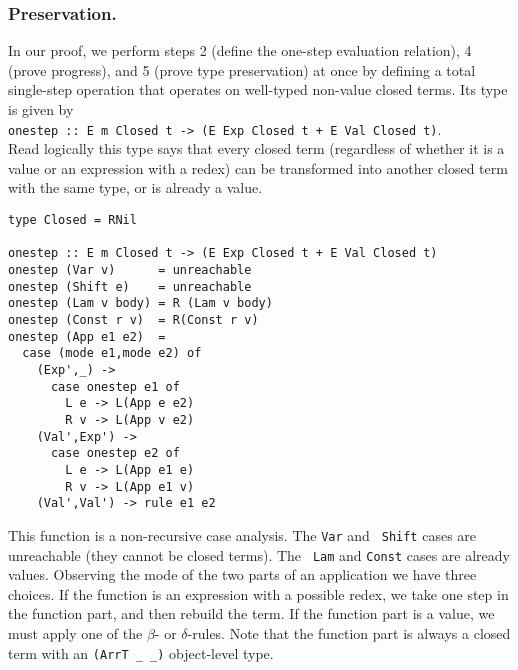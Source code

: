 \documentclass[11pt,twoside,A4]{llncs}
\begin{document}
\subsubsection{Preservation.}

In our proof, we perform steps 2 (define the one-step evaluation
relation), 4 (prove progress), and 5 (prove type preservation)
at once by defining a total single-step operation that operates on
well-typed non-value closed terms. Its type is given by\\ {\tt onestep
:: E m Closed t -> (E Exp Closed t + E Val Closed t)}.\\ Read logically
this type says that every closed term (regardless of whether it is a
value or an expression with a redex) can be transformed into another
closed term with the same type, or is already a value.

{\small
\begin{verbatim}
type Closed = RNil

onestep :: E m Closed t -> (E Exp Closed t + E Val Closed t)
onestep (Var v)      = unreachable
onestep (Shift e)    = unreachable
onestep (Lam v body) = R (Lam v body)
onestep (Const r v)  = R(Const r v)
onestep (App e1 e2)  =
  case (mode e1,mode e2) of
    (Exp',_) ->
      case onestep e1 of
        L e -> L(App e e2)
        R v -> L(App v e2)
    (Val',Exp') ->
      case onestep e2 of
        L e -> L(App e1 e)
        R v -> L(App e1 v)
    (Val',Val') -> rule e1 e2
\end{verbatim}}

This function is a non-recursive case analysis. The {\tt Var} and {\tt
Shift} cases are unreachable (they cannot be closed terms). The {\tt
Lam} and {\tt Const} cases are already values. Observing the mode of
the two parts of an application we have three choices. If the function
is an expression with a possible redex, we take one step in the
function part, and then rebuild the term. If the function part is a value,
we must apply one of the $\beta$- or $\delta$-rules. Note that the
function part is always a closed term with an {\tt (ArrT \_ \_)}
object-level type.
\end{document}
